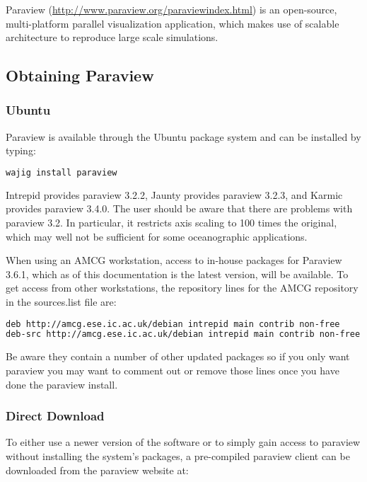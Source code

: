 
Paraview (\url{http://www.paraview.org/paraviewindex.html}) is an open-source, multi-platform parallel visualization application, which makes use of scalable architecture to reproduce large scale simulations.

\subsection{Obtaining Paraview}
\subsubsection{Ubuntu}
Paraview is available through the Ubuntu package system and can be installed by typing:

\begin{example}
  \begin{lstlisting}[language=bash]
wajig install paraview
\end{lstlisting}
\end{example}

Intrepid provides paraview 3.2.2, Jaunty provides paraview 3.2.3, and Karmic
provides paraview 3.4.0. The user should be aware that there are problems
with paraview 3.2. In particular, it restricts axis scaling to 100 times the
original, which may well not be sufficient for some oceanographic
applications.

When using an AMCG workstation, access to in-house packages for Paraview
3.6.1, which as of this documentation is the latest version, will be
available. To get access from other workstations, the repository lines for
the AMCG repository in the sources.list file are:

\begin{example}
  \begin{lstlisting}[language=bash]
deb http://amcg.ese.ic.ac.uk/debian intrepid main contrib non-free
deb-src http://amcg.ese.ic.ac.uk/debian intrepid main contrib non-free
\end{lstlisting}
\end{example}

Be aware they contain a number of other updated packages so if you only want
paraview you may want to comment out or remove those lines once you have
done the paraview install.

\subsubsection{Direct Download}

To either use a newer version of the software or to simply gain access to
paraview without installing the system's packages, a pre-compiled paraview
client can be downloaded from the paraview website at:

